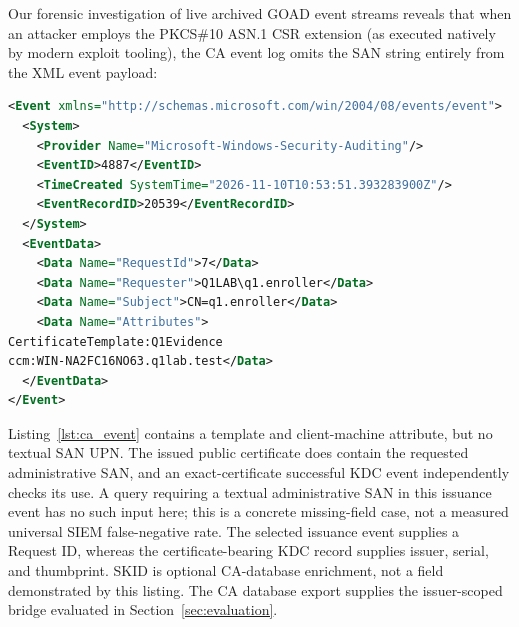 Our forensic investigation of live archived GOAD event streams reveals that when an attacker employs the PKCS\#10 ASN.1 CSR extension (as executed natively by modern exploit tooling), the CA event log omits the SAN string entirely from the XML event payload:
\begin{lstlisting}[language=XML,caption={Selected fields from the independent 2019 enabled-condition capture: Security record 20539. The raw XML is retained in the artifact.},label=lst:ca_event]
<Event xmlns="http://schemas.microsoft.com/win/2004/08/events/event">
  <System>
    <Provider Name="Microsoft-Windows-Security-Auditing"/>
    <EventID>4887</EventID>
    <TimeCreated SystemTime="2026-11-10T10:53:51.393283900Z"/>
    <EventRecordID>20539</EventRecordID>
  </System>
  <EventData>
    <Data Name="RequestId">7</Data>
    <Data Name="Requester">Q1LAB\q1.enroller</Data>
    <Data Name="Subject">CN=q1.enroller</Data>
    <Data Name="Attributes">
CertificateTemplate:Q1Evidence
ccm:WIN-NA2FC16NO63.q1lab.test</Data>
  </EventData>
</Event>
\end{lstlisting}

Listing~\ref{lst:ca_event} contains a template and client-machine attribute, but no textual SAN UPN. The issued public certificate does contain the requested administrative SAN, and an exact-certificate successful KDC event independently checks its use. A query requiring a textual administrative SAN in this issuance event has no such input here; this is a concrete missing-field case, not a measured universal SIEM false-negative rate. The selected issuance event supplies a Request ID, whereas the certificate-bearing KDC record supplies issuer, serial, and thumbprint. SKID is optional CA-database enrichment, not a field demonstrated by this listing. The CA database export supplies the issuer-scoped bridge evaluated in Section~\ref{sec:evaluation}.
